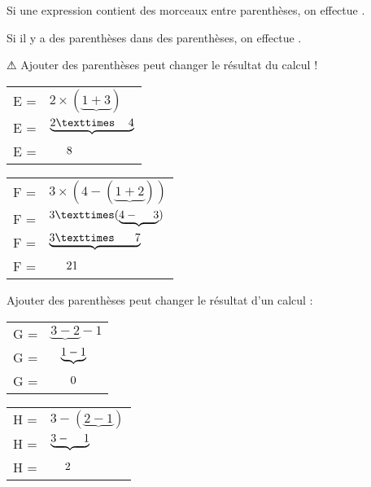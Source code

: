 \documentclass[../€Cours-complet/Cours-complet]{subfiles}
\begin{document}
\begin{cours}
	Si une expression contient des morceaux entre parenthèses, on effectue .

	Si il y a des parenthèses dans des parenthèses, on effectue
	 .

	{\color{red} ⚠ Ajouter des parenthèses peut changer le résultat du calcul !}
\end{cours}

\newpage

\begin{exemple}
	\begin{minipage}{0.5\textwidth}
		\begin{tabular}{ll}
			E = & $2 × (\underbrace{1 + 3})$          \\
			E = & $\underbrace{2 × \hspace{1.2em} 4}$ \\
			E = & $\hspace{1.5em}8$
		\end{tabular}
	\end{minipage}
	\begin{minipage}{0.5\textwidth}
		\begin{tabular}{ll}
			F = & $3 × (4 - (\underbrace{1 + 2}))$         \\
			F = & $3 × (\underbrace{4 - \hspace{1.3em}3})$ \\
			F = & $\underbrace{3 × \hspace{1.8em}7}$       \\
			F = & $\hspace{1.5em}21$
		\end{tabular}
	\end{minipage}
\end{exemple}

\begin{exemple}
	Ajouter des parenthèses peut changer le résultat d'un calcul :

	\begin{minipage}{0.5\textwidth}
		\begin{tabular}{ll}
			G = & $\underbrace{3 - 2} - 1$           \\
			G = & $\hspace{0.9em}\underbrace{1 - 1}$ \\
			G = & $\hspace{1.7em}0$
		\end{tabular}
	\end{minipage}
	\begin{minipage}{0.5\textwidth}
		\begin{tabular}{ll}
			H = & $3 - (\underbrace{2 - 1})$          \\
			H = & $\underbrace{3 - \hspace{1.2em} 1}$ \\
			H = & $\hspace{1.3em}2$
		\end{tabular}
	\end{minipage}
\end{exemple}
\end{document}
